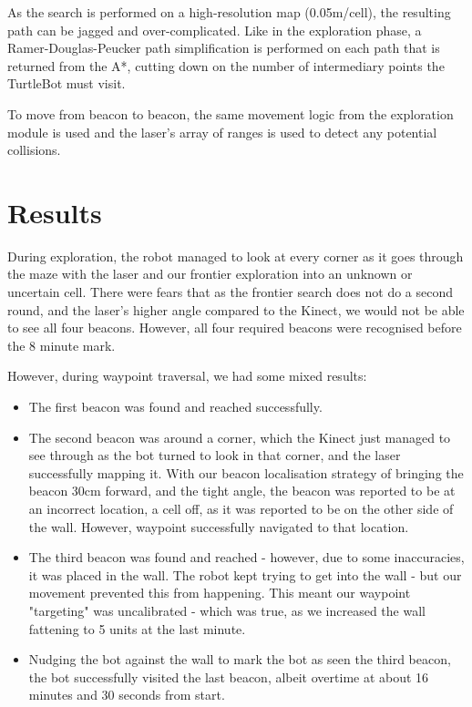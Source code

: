 \documentclass[titlepage,12pt,a4paper]{article}
\begin{document}
As the search is performed on a high-resolution map (0.05m/cell), the resulting path can be jagged and over-complicated. Like in the exploration phase, a Ramer-Douglas-Peucker path simplification is performed on each path that is returned from the A*, cutting down on the number of intermediary points the TurtleBot must visit.

To move from beacon to beacon, the same movement logic from the exploration module is used and the laser's array of ranges is used to detect any potential collisions.

\pagebreak
\section{Results}
During exploration, the robot managed to look at every corner as it goes through the maze with the laser and our frontier exploration into an unknown or uncertain cell. There were fears that as the frontier search does not do a second round, and the laser's higher angle compared to the Kinect, we would not be able to see all four beacons. However, all four required beacons were recognised before the 8 minute mark.

However, during waypoint traversal, we had some mixed results:

\begin{itemize}
	\item The first beacon was found and reached successfully.
	\item The second beacon was around a corner, which the Kinect just managed to see through as the bot turned to look in that corner, and the laser successfully mapping it. With our beacon localisation strategy of bringing the beacon 30cm forward, and the tight angle, the beacon was reported to be at an incorrect location, a cell off, as it was reported to be on the other side of the wall. However, waypoint successfully navigated to that location.
	\item The third beacon was found and reached - however, due to some inaccuracies, it was placed in the wall. The robot kept trying to get into the wall - but our movement prevented this from happening. This meant our waypoint "targeting" was uncalibrated - which was true, as we increased the wall fattening to 5 units at the last minute. 
	\item Nudging the bot against the wall to mark the bot as seen the third beacon, the bot successfully visited the last beacon, albeit overtime at about 16 minutes and 30 seconds from start.
\end{itemize}
\end{document}
